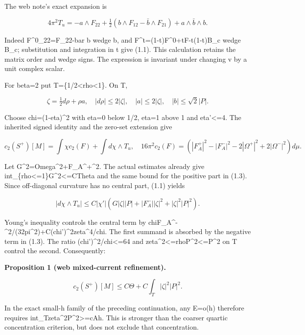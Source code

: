 \documentclass[
  10pt,
]{article}
\begin{document}
The web note's exact expansion is

\[
 4\pi^2T_u=-a\wedge F_{22}
 +\tfrac12(b\wedge F_{12}-\bar b\wedge F_{21})
 +a\wedge\bar b\wedge b.                         \tag{1.1}
\]

Indeed F\^{}0\_22=F\_22-bar b wedge b, and
F\^{}t=(1-t)F\^{}0+tF-t(1-t)B\_c wedge B\_c; substitution and
integration in t give (1.1). This calculation retains the matrix order
and wedge signs. The expression is invariant under changing v by a unit
complex scalar.

For beta=2 put T=\{1/2\textless rho\textless1\}. On T,

\[
 \zeta=\tfrac12d\rho+\rho a,\quad
 |d\rho|\le2|\zeta|,\quad |a|\le2|\zeta|,
 \quad |b|\le\sqrt2|P|.                             \tag{1.2}
\]

Choose chi=(1-eta)\^{}2 with eta=0 below 1/2, eta=1 above 1 and
\textbar eta'\textbar\textless=4. The inherited signed identity and the
zero-set extension give

\[
 c_2(S^+)[M]=\int\chi c_2(F)+\int d\chi\wedge T_u,
 \quad
 16\pi^2c_2(F)=
 (|F_A^+|^2-|F_A^-|^2-2|\Omega^+|^2+2|\Omega^-|^2)d\mu.
                                                               \tag{1.3}
\]

Let G\^{}2=\textbar Omega\textbar\^{}2+\textbar F\_A\^{}+\textbar\^{}2.
The actual estimates already give
int\_\{rho\textless=1\}G\^{}2\textless=CTheta and the same bound for the
positive part in (1.3). Since off-diagonal curvature has no central
part, (1.1) yields

\[
 |d\chi\wedge T_u|\le C|\chi'|
 (G|\zeta||P|+|F_A^-||\zeta|^2+|\zeta|^2|P|^2).
\]

Young's inequality controls the central term by
chi\textbar F\_A\^{}-\textbar\^{}2/(32pi\^{}2)+C(chi')\^{}2\textbar zeta\textbar\^{}4/chi.
The first summand is absorbed by the negative term in (1.3). The ratio
(chi')\^{}2/chi\textless=64 and
\textbar zeta\textbar\^{}2\textless=rho\textbar P\textbar\^{}2\textless=\textbar P\textbar\^{}2
on T control the second. Consequently:

\textbf{Proposition 1 (web mixed-current refinement).}

\[
 \boxed{c_2(S^+)[M]\le C\Theta+C\int_T|\zeta|^2|P|^2.} \tag{1.4}
\]

In the exact small-h family of the preceding continuation, any E=o(h)
therefore requires
int\_T\textbar zeta\textbar\^{}2\textbar P\textbar\^{}2\textgreater=cAh.
This is stronger than the coarser quartic concentration criterion, but
does not exclude that concentration.
\end{document}
